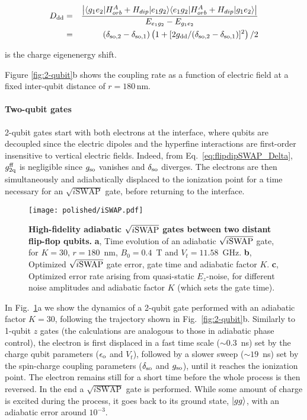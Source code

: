 \begin{eqnarray}\label{eq:Ddd}
D_{\rm dd}&=&\frac{\left| \langle g_1 e_2|H_{orb}^A+H_{dip}|e_1 g_2\rangle\langle e_1 g_2 |H_{orb}^A +H_{dip}|g_1 e_2 \rangle\right|}{E_{e_1 g_2}-E_{g_1 e_2}}\\
& = & (\delta_{\rm so,2}-\delta_{\rm so,1})\left(1+[2g_{\rm dd}/(\delta_{\rm so,2}-\delta_{\rm so,1})]^2\right)/2
\end{eqnarray}

 is the charge eigenenergy shift.

Figure \ref{fig:2-qubit}b shows the coupling rate as a function of electric field at a fixed inter-qubit distance of $r=180\,$nm. 


\paragraph{Two-qubit gates}

2-qubit gates start with both electrons at the interface, where qubits are decoupled since the electric dipoles and the hyperfine interactions are first-order insensitive to vertical electric fields. Indeed, from Eq.~\ref{eq:flipdipSWAP_Delta}, $g_{\rm 2q}^{\rm ff}$ is negligible since $g_{\rm so}$ vanishes and $\delta_{\rm so}$ diverges. The electrons are then simultaneously and adiabatically displaced to the ionization point for a time necessary for an $\sqrt{i\mathrm{SWAP}}$ gate, before returning to the interface. 

\begin{figure}[h]
	\centering
	\texttt{[image: polished/iSWAP.pdf]}
	\caption[High-fidelity adiabatic $\sqrt{i{\rm SWAP}}$ gates between two distant flip-flop qubits]{\textbf{High-fidelity adiabatic $\sqrt{i{\rm SWAP}}$ gates between two distant flip-flop qubits.}
		\textbf{a}, Time evolution of an adiabatic $\sqrt{i \rm SWAP}$ gate, for $K=30$, $r=180$~nm, $B_0=0.4$~T and $V_t=11.58$~GHz.
		\textbf{b}, Optimized $\sqrt{i{\rm SWAP}}$ gate error, gate time and adiabatic factor $K$.
		\textbf{c}, Optimized error rate arising from quasi-static $E_z$-noise, for different noise amplitudes and adiabatic factor $K$ (which sets the gate time).}
	\label{fig:iSWAP}
\end{figure}


In Fig.~\ref{fig:iSWAP}a we show the dynamics of a 2-qubit gate performed with an adiabatic factor $K=30$, following the trajectory shown in Fig.~\ref{fig:2-qubit}b. Similarly to 1-qubit $z$ gates (the calculations are analogous to those in adiabatic phase control), the electron is first displaced in a fast time scale ($\sim0.3$~ns) set by the charge qubit parameters ($\epsilon_{\rm o}$ and $V_t$), followed by a slower sweep ($\sim19$~ns) set by the spin-charge coupling parameters ($\delta_{\rm so}$ and $g_{\rm so}$), until it reaches the ionization point. The electron remains still for a short time before the whole process is then reversed. In the end a $\sqrt{i\mathrm{SWAP}}$ gate is performed. While some amount of charge is excited during the process, it goes back to its ground state, $|gg\rangle$, with an adiabatic error around $10^{-3}$.

